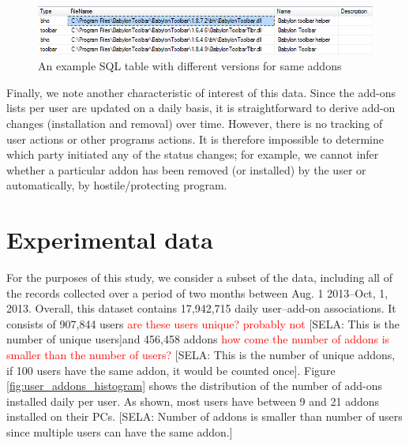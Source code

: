 \documentclass[11pt,oneside]{book}
\let\Oldsection\section
\renewcommand{\section}{\FloatBarrier\Oldsection}
\begin{document}
\begin{figure}[t]
\centering
\begin{small}
\includegraphics[scale=.8,angle=0]{figures/addons_versioning_snapshot.png}
\end{small}
\caption{An example SQL table with different versions for same addons}
\label{fig:addons_versioning_snapshot}
\end{figure}

Finally, we note another characteristic of interest of this data.  Since the add-ons lists per user are updated on a daily basis, it is straightforward to derive add-on changes (installation and removal) over time. However, there is no tracking of user actions or other programs actions. It is therefore impossible to determine which party initiated any of the status changes; for example, we cannot infer whether a particular addon has been removed (or installed) by the user or automatically, by hostile/protecting program. 

\section{Experimental data}

For the purposes of this study, we consider a subset of the data, including all of the records collected over a  period of two months between Aug. 1 2013--Oct, 1, 2013. Overall, this dataset contains 17,942,715 daily user--add-on associations. It consists of 907,844 users \textcolor{red}{are these users unique? probably not} [SELA: This is the number of unique users]and 456,458 addons \textcolor{red}{how come the number of addons is smaller than the number of users?} [SELA: This is the number of unique addons, if 100 users have the same addon, it would be counted once]. Figure \ref{fig:user_addons_histogram} shows the distribution of the number of add-ons installed daily per user. As shown,  most users have between 9 and 21 addons installed on their PCs.
[SELA: Number of addons is smaller than number of users since multiple users can have the same addon.]
\end{document}
